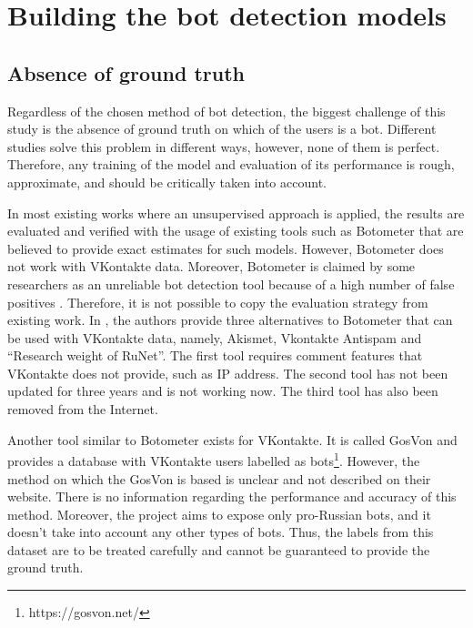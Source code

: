 \section{Building the bot detection models}
\subsection{Absence of ground truth}
Regardless of the chosen method of bot detection, the biggest challenge of this study is the absence of ground truth on which of the users is a bot. Different studies solve this problem in different ways, however, none of them is perfect. Therefore, any training of the model and evaluation of its performance is rough, approximate, and should be critically taken into account.

In most existing works where an unsupervised approach is applied, the results are evaluated and verified with the usage of existing tools such as Botometer that are believed to provide exact estimates for such models. However, Botometer does not work with VKontakte data. Moreover, Botometer is claimed by some researchers as an unreliable bot detection tool because of a high number of false positives \cite{Gallwitz2022}. Therefore, it is not possible to copy the evaluation strategy from existing work. In \cite{Alymov2016}, the authors provide three alternatives to Botometer that can be used with VKontakte data, namely, Akismet, Vkontakte Antispam and ``Research weight of RuNet''. The first tool requires comment features that VKontakte does not provide, such as IP address. The second tool has not been updated for three years and is not working now. The third tool has also been removed from the Internet.

Another tool similar to Botometer exists for VKontakte. It is called GosVon and provides a database with VKontakte users labelled as bots\footnote{https://gosvon.net/}. However, the method on which the GosVon is based is unclear and not described on their website. There is no information regarding the performance and accuracy of this method. Moreover, the project aims to expose only pro-Russian bots, and it doesn’t take into account any other types of bots. Thus, the labels from this dataset are to be treated carefully and cannot be guaranteed to provide the ground truth.

